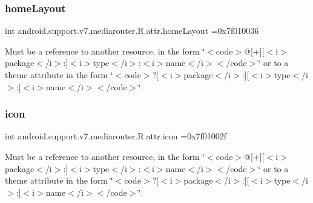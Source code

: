 \subsubsection{\texorpdfstring{home\+Layout}{homeLayout}}
{\footnotesize\ttfamily int android.\+support.\+v7.\+mediarouter.\+R.\+attr.\+home\+Layout =0x7f010036\hspace{0.3cm}{\ttfamily [static]}}

Must be a reference to another resource, in the form \char`\"{}$<$code$>$@\mbox{[}+\mbox{]}\mbox{[}$<$i$>$package$<$/i$>$\+:\mbox{]}$<$i$>$type$<$/i$>$\+:$<$i$>$name$<$/i$>$$<$/code$>$\char`\"{} or to a theme attribute in the form \char`\"{}$<$code$>$?\mbox{[}$<$i$>$package$<$/i$>$\+:\mbox{]}\mbox{[}$<$i$>$type$<$/i$>$\+:\mbox{]}$<$i$>$name$<$/i$>$$<$/code$>$\char`\"{}. \mbox{\label{classandroid_1_1support_1_1v7_1_1mediarouter_1_1R_1_1attr_a36a78f6af61f38fe96606868a1664662}} 
\subsubsection{\texorpdfstring{icon}{icon}}
{\footnotesize\ttfamily int android.\+support.\+v7.\+mediarouter.\+R.\+attr.\+icon =0x7f01002f\hspace{0.3cm}{\ttfamily [static]}}

Must be a reference to another resource, in the form \char`\"{}$<$code$>$@\mbox{[}+\mbox{]}\mbox{[}$<$i$>$package$<$/i$>$\+:\mbox{]}$<$i$>$type$<$/i$>$\+:$<$i$>$name$<$/i$>$$<$/code$>$\char`\"{} or to a theme attribute in the form \char`\"{}$<$code$>$?\mbox{[}$<$i$>$package$<$/i$>$\+:\mbox{]}\mbox{[}$<$i$>$type$<$/i$>$\+:\mbox{]}$<$i$>$name$<$/i$>$$<$/code$>$\char`\"{}. \mbox{\label{classandroid_1_1support_1_1v7_1_1mediarouter_1_1R_1_1attr_a5691ffb921d3194a5b3e342ee2a6ecc6}} 
